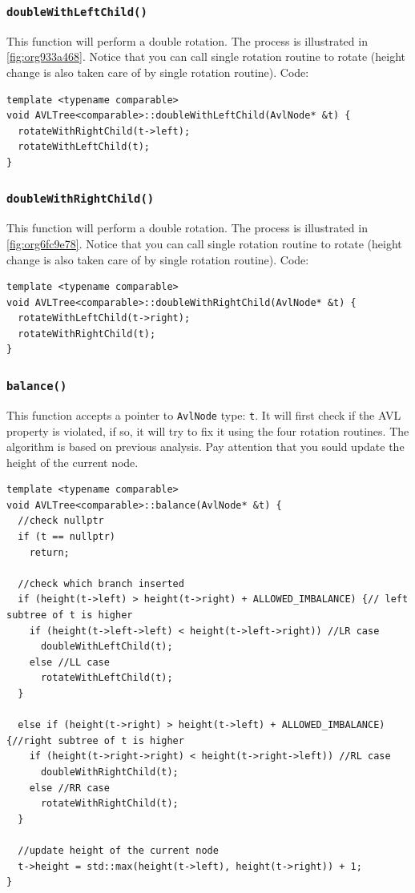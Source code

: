 \documentclass[11pt]{book}
\begin{document}
\subsubsection{\texttt{doubleWithLeftChild()}}
\label{sec:org6075a56}
This function will perform a double rotation. The process is illustrated in \ref{fig:org933a468}. Notice that you can call single rotation routine to rotate (height change is also taken care of by single rotation routine). Code:
\begin{verbatim}
template <typename comparable>
void AVLTree<comparable>::doubleWithLeftChild(AvlNode* &t) {
  rotateWithRightChild(t->left);
  rotateWithLeftChild(t);
}
\end{verbatim}
\subsubsection{\texttt{doubleWithRightChild()}}
\label{sec:orgbd01de2}
This function will perform a double rotation. The process is illustrated in \ref{fig:org6fc9e78}. Notice that you can call single rotation routine to rotate (height change is also taken care of by single rotation routine). Code:
\begin{verbatim}
template <typename comparable>
void AVLTree<comparable>::doubleWithRightChild(AvlNode* &t) {
  rotateWithLeftChild(t->right);
  rotateWithRightChild(t);
}
\end{verbatim}
\subsubsection{\texttt{balance()}}
\label{sec:org6a88c44}
This function accepts a pointer to \texttt{AvlNode} type: \texttt{t}. It will first check if the AVL property is violated, if so, it will try to fix it using the four rotation routines. The algorithm is based on previous analysis. Pay attention that you sould update the height of the current node.
\begin{verbatim}
template <typename comparable>
void AVLTree<comparable>::balance(AvlNode* &t) {
  //check nullptr
  if (t == nullptr)
    return;

  //check which branch inserted
  if (height(t->left) > height(t->right) + ALLOWED_IMBALANCE) {// left subtree of t is higher
    if (height(t->left->left) < height(t->left->right)) //LR case
      doubleWithLeftChild(t);
    else //LL case
      rotateWithLeftChild(t);
  }

  else if (height(t->right) > height(t->left) + ALLOWED_IMBALANCE) {//right subtree of t is higher 
    if (height(t->right->right) < height(t->right->left)) //RL case
      doubleWithRightChild(t);
    else //RR case
      rotateWithRightChild(t);
  }

  //update height of the current node
  t->height = std::max(height(t->left), height(t->right)) + 1;
}
\end{verbatim}
\end{document}
